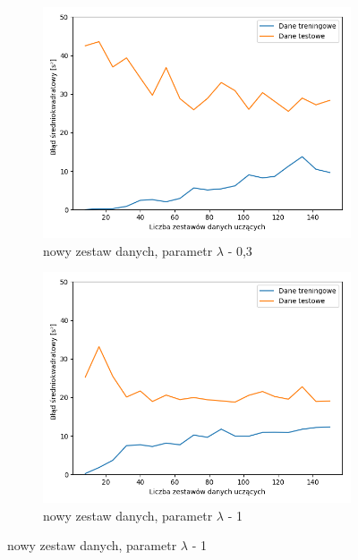 \documentclass[12pt]{aghdpl}
\begin{document}
\begin{figure}[h]
		 	\begin{subfigure}{.5\linewidth}
		 		\includegraphics[width =\linewidth]{wykresy/8_zebranie_wiekszej_ilosci_danych/200-400/regularyzacja_0_3_learning_curves.png}
		 		\caption{nowy zestaw danych, parametr $\lambda$ - 0,3}
		 	\end{subfigure}
		 	\begin{subfigure}{.5\linewidth}
		 		\includegraphics[width =\linewidth]{wykresy/8_zebranie_wiekszej_ilosci_danych/200-400/regularyzacja_1_learning_curves.png}
		 		\caption{nowy zestaw danych, parametr $\lambda$ - 1}
		 	\end{subfigure}
		 	

\end{figure}
\end{document}

